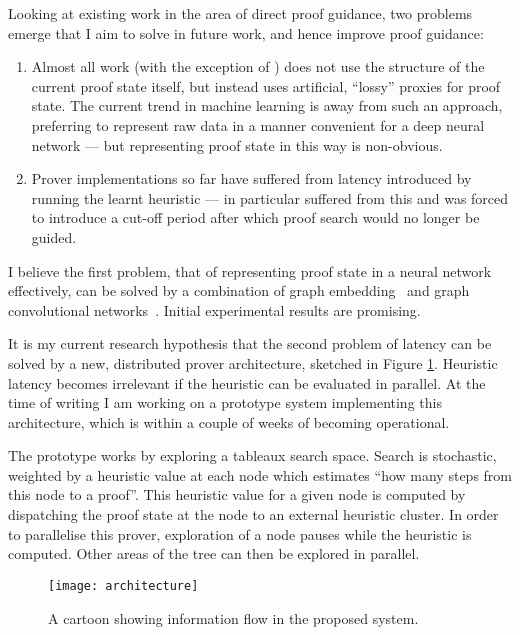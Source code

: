 \documentclass[a4paper, 10pt]{article}
\begin{document}
Looking at existing work in the area of direct proof guidance, two problems emerge that I aim to solve in future work, and hence improve proof guidance:
\begin{enumerate}
	\item Almost all work (with the exception of \textcite{deep-proof-search}) does not use the structure of the current proof state itself, but instead uses artificial, ``lossy'' proxies for proof state. The current trend in machine learning is away from such an approach, preferring to represent raw data in a manner convenient for a deep neural network --- but representing proof state in this way is non-obvious.
	\item Prover implementations so far have suffered from latency introduced by running the learnt heuristic --- \textcite{deep-proof-search} in particular suffered from this and was forced to introduce a cut-off period after which proof search would no longer be guided.
\end{enumerate}

I believe the first problem, that of representing proof state in a neural network effectively, can be solved by a combination of graph embedding~\cite{axiom-selection-graph} and graph convolutional networks~\cite{GCN}.
Initial experimental results are promising.

It is my current research hypothesis that the second problem of latency can be solved by a new, distributed prover architecture, sketched in Figure \ref{fig:architecture}.
Heuristic latency becomes irrelevant if the heuristic can be evaluated in parallel.
At the time of writing I am working on a prototype system implementing this architecture, which is within a couple of weeks of becoming operational.

The prototype works by exploring a tableaux search space.
Search is stochastic, weighted by a heuristic value at each node which estimates ``how many steps from this node to a proof''.
This heuristic value for a given node is computed by dispatching the proof state at the node to an external heuristic cluster.
In order to parallelise this prover, exploration of a node pauses while the heuristic is computed.
Other areas of the tree can then be explored in parallel.

\begin{figure}
	\label{fig:architecture}
	\centering
	\texttt{[image: architecture]}
	\caption{A cartoon showing information flow in the proposed system.}
\end{figure}
\end{document}
